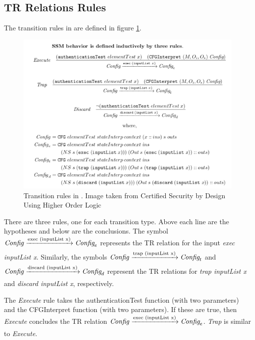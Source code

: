 \documentclass[../../main/main.tex]{subfiles}
\begin{document}
\subsection{TR Relations Rules}
The transition rules in  are defined in figure \ref{trrules}.

\begin{figure}[h!]
\centering
\includegraphics[width=\textwidth]{../figures/trrules}
\caption{\label{trrules} Transition rules in .   Image taken from Certified Security by Design Using Higher Order Logic \cite{certmanual}}
\end{figure}

There are three rules, one for each transition type.  Above each line are the hypotheses and below are the conclusions.  The symbol $\text{\textit{Config}}  \xrightarrow[\text{}]{\text{exec (inputList x)}} \textit{Config}_e$ represents the TR relation for the input \textit{exec inputList x}.  Similarly, the symbols $\text{\textit{Config}}  \xrightarrow[\text{}]{\text{trap (inputList x)}} \textit{Config}_t$ and $\text{\textit{Config}}  \xrightarrow[\text{}]{\text{discard (inputList x)}} \textit{Config}_d$ represent the TR relations for \textit{trap inputList x} and \textit{discard inputList x}, respectively. 


The \textit{Execute} rule takes the authenticationTest function (with two parameters) and the CFGInterpret function (with two parameters).  If these are true, then \textit{Execute} concludes the TR relation $\text{\textit{Config}}  \xrightarrow[\text{}]{\text{exec (inputList x)}} \textit{Config}_e$.  \textit{Trap} is similar to \textit{Execute}.
\end{document}
